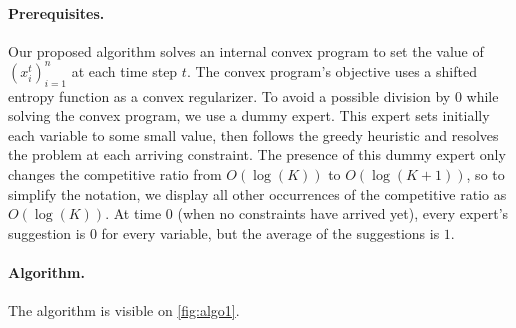 \paragraph{Prerequisites.} Our proposed algorithm solves an internal convex program to set the value of $(x_i^t)_{i=1}^n$ at each time step $t$. The convex program's objective uses a shifted entropy function as a convex regularizer. To avoid a possible division by $0$ while solving the convex program, we use a dummy expert. This expert sets initially each variable to some small value, then follows the greedy heuristic and resolves the problem at each arriving constraint. The presence of this dummy expert only changes the competitive ratio from $O(\log(K))$ to $O(\log(K + 1))$, so to simplify the notation, we display all other occurrences of the competitive ratio as $O(\log(K))$. At time $0$ (when no constraints have arrived yet), every expert's suggestion is $0$ for every variable, but the average of the suggestions is $1$.

\paragraph{Algorithm.} The algorithm is visible on \cref{fig:algo1}.


